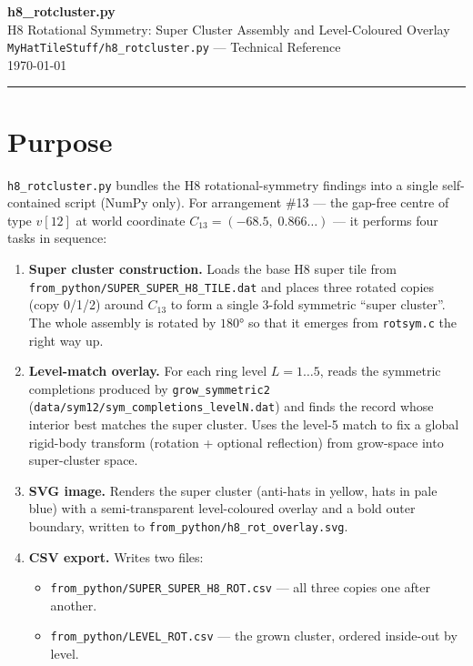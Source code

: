 \documentclass[10pt,a4paper]{article}
\let\polysection\section
\renewcommand\section{\needspace{0.16\textheight}\polysection}
\newcommand{\code}[1]{\texttt{\small #1}}
\newcommand{\file}[1]{\texttt{\footnotesize #1}}
\begin{document}
\begin{center}
  {\Huge\bfseries\color{titlecolor} h8\_rotcluster.py}\\[4pt]
  {\large\color{headercolor} H8 Rotational Symmetry: Super Cluster Assembly and Level-Coloured Overlay}\\[6pt]
  {\small \file{MyHatTileStuff/h8\_rotcluster.py} — Technical Reference}\\[2pt]
  {\small\color{gray} \today}
\end{center}

\vspace{6pt}
\noindent\rule{\linewidth}{1pt}
\vspace{4pt}

\section{Purpose}

\code{h8\_rotcluster.py} bundles the H8 rotational-symmetry findings into a
single self-contained script (NumPy only).  For arrangement \#13 — the
gap-free centre of type $v[12]$ at world coordinate
$C_{13} = (-68.5,\; 0.866\ldots)$ — it performs four tasks in sequence:

\begin{enumerate}
  \item \textbf{Super cluster construction.}  Loads the base H8 super tile
    from \file{from\_python/SUPER\_SUPER\_H8\_TILE.dat} and places three
    rotated copies (copy 0/1/2) around $C_{13}$ to form a single
    3-fold symmetric ``super cluster''.  The whole assembly is rotated by
    $180°$ so that it emerges from \code{rotsym.c} the right way up.
  \item \textbf{Level-match overlay.}  For each ring level $L = 1\ldots 5$,
    reads the symmetric completions produced by \code{grow\_symmetric2}
    (\file{data/sym12/sym\_completions\_levelN.dat}) and finds the record
    whose interior best matches the super cluster.  Uses the level-5 match to
    fix a global rigid-body transform (rotation + optional reflection) from
    grow-space into super-cluster space.
  \item \textbf{SVG image.}  Renders the super cluster (anti-hats in yellow,
    hats in pale blue) with a semi-transparent level-coloured overlay and a
    bold outer boundary, written to \file{from\_python/h8\_rot\_overlay.svg}.
  \item \textbf{CSV export.}  Writes two files:
    \begin{itemize}
      \item \file{from\_python/SUPER\_SUPER\_H8\_ROT.csv} — all three copies
        one after another.
      \item \file{from\_python/LEVEL\_ROT.csv} — the grown cluster, ordered
        inside-out by level.
    \end{itemize}
\end{enumerate}
\end{document}
